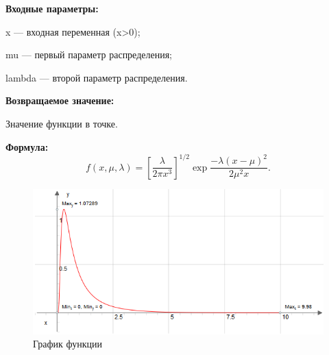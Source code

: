 \textbf{Входные параметры:}

  x --- входная переменная (x>0);
  
 mu --- первый параметр распределения;
 
 lambda --- второй параметр распределения.

\textbf{Возвращаемое значение:}
 
 Значение функции в точке.
 
\textbf{Формула:}
\begin{equation*}
f(x,\mu,\lambda) = \left[\frac{\lambda}{2 \pi x^3}\right]^{1/2} \exp{\frac{-\lambda (x-\mu)^2}{2 \mu^2 x}}.
\end{equation*}

 \begin{figure} [h] 
   \center
   \includegraphics {HML_ProbabilityDensityFunctionOfInverseGaussianDistribution_Graph.png}
   \caption{График функции} 
   \label{img:HML_ProbabilityDensityFunctionOfInverseGaussianDistribution_Graph}  
 \end{figure}
 
